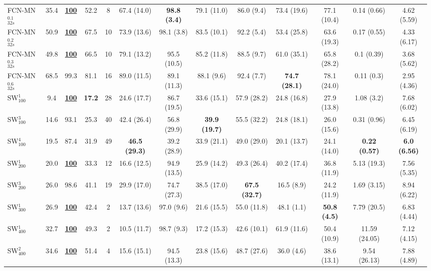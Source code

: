 \documentclass[a4paper,authoryear,review]{elsarticle}
\begin{document}
\begin{table}[]
\begin{adjustbox}{angle=90}
{\begin{tabular}{lcccccccccccc}
                FCN-MN$_{32s}^{0.1}$ & 35.4 & {\ul \textbf{100}} & 52.2 & 8 & 67.4 (14.0) & \textbf{98.8 (3.4)} & 79.1 (11.0) & 86.0 (9.4) & 73.4 (19.6) & 77.1 (10.4) & 0.14 (0.66) & 4.62 (5.59) \\
                FCN-MN$_{32s}^{0.2}$ & 50.9 & {\ul \textbf{100}} & 67.5 & 10 & 73.9 (13.6) & 98.1 (3.8) & 83.5 (10.1) & 92.2 (5.4) & 53.4 (25.8) & 63.6 (19.3) & 0.17 (0.55) & 4.33 (6.17) \\
                FCN-MN$_{32s}^{0.3}$ & 49.8 & {\ul \textbf{100}} & 66.5 & 10 & 79.1 (13.2) & 95.5 (10.5) & 85.2 (11.8) & 88.5 (9.7) & 61.0 (35.1) & 65.8 (28.2) & 0.1 (0.39) & 3.68 (5.62) \\
                FCN-MN$_{32s}^{0.6}$ & 68.5 & 99.3 & 81.1 & 16 & 89.0 (11.5) & 89.1 (11.3) & 88.1 (9.6) & 92.4 (7.7) & \textbf{74.7 (28.1)} & 78.1 (24.0) & 0.11 (0.3) & 2.95 (4.36) \\
                SW$_{100}^{1}$ & 9.4 & {\ul \textbf{100}} & \textbf{17.2} & 28 & 24.6 (17.7) & 86.7 (19.5) & 33.6 (15.1) & 57.9 (28.2) & 24.8 (16.8) & 27.9 (13.8) & 1.08 (3.2) & 7.68 (6.02) \\
                SW$_{100}^{3}$ & 14.6 & 93.1 & 25.3 & 40 & 42.4 (26.4) & 56.8 (29.9) & \textbf{39.9 (19.7)} & 55.5 (32.2) & 24.8 (18.1) & 26.0 (15.6) & 0.31 (0.96) & 6.45 (6.19) \\
                SW$_{100}^{4}$ & 19.5 & 87.4 & 31.9 & 49 & \textbf{46.5 (29.3)} & 39.2 (28.9) & 33.9 (21.1) & 49.0 (29.0) & 20.1 (13.7) & 24.1 (14.0) & \textbf{0.22 (0.57)} & \textbf{6.0 (6.56)} \\
                SW$_{200}^{1}$ & 20.0 & {\ul \textbf{100}} & 33.3 & 12 & 16.6 (12.5) & 94.9 (13.5) & 25.9 (14.2) & 49.3 (26.4) & 40.2 (17.4) & 36.8 (11.9) & 5.13 (19.3) & 7.56 (5.35) \\
                SW$_{200}^{3}$ & 26.0 & 98.6 & 41.1 & 19 & 29.9 (17.0) & 74.7 (27.3) & 38.5 (17.0) & \textbf{67.5 (32.7)} & 16.5 (8.9) & 24.2 (11.9) & 1.69 (3.15) & 8.94 (6.22) \\
                SW$_{300}^{1}$ & 26.9 & {\ul \textbf{100}} & 42.4 & 2 & 13.7 (13.6) & 97.0 (9.6) & 21.6 (15.5) & 55.0 (11.8) & 48.1 (1.1) & \textbf{50.8 (4.5)} & 7.79 (20.5) & 6.83 (4.44) \\
                SW$_{400}^{1}$ & 32.7 & {\ul \textbf{100}} & 49.3 & 2 & 10.5 (11.7) & 98.7 (9.3) & 17.2 (15.3) & 42.6 (10.1) & 61.9 (11.6) & 50.4 (10.9) & 11.59 (24.05) & 7.12 (4.15) \\
                SW$_{400}^{2}$ & 34.6 & {\ul \textbf{100}} & 51.4 & 4 & 15.6 (15.1) & 94.5 (13.3) & 23.8 (15.6) & 48.7 (27.6) & 36.0 (4.6) & 38.6 (13.1) & 9.54 (26.13) & 7.88 (4.89) \\

\end{tabular}}
\end{adjustbox}
\end{table}
\end{document}
